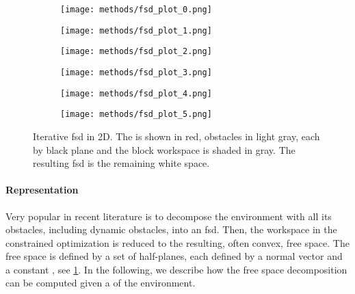 \begin{figure}[ht]
  \centering
  \begin{subfigure}{0.33\linewidth}
    \centering
    \texttt{[image: methods/fsd\_plot\_0.png]}
    \vspace*{0.5em}
  \end{subfigure}%
  \begin{subfigure}{0.33\linewidth}
    \centering
    \texttt{[image: methods/fsd\_plot\_1.png]}
    \vspace*{0.5em}
  \end{subfigure}%
  \begin{subfigure}{0.33\linewidth}
    \centering
    \texttt{[image: methods/fsd\_plot\_2.png]}
    \vspace*{0.5em}
  \end{subfigure}
  \begin{subfigure}{0.33\linewidth}
    \centering
    \texttt{[image: methods/fsd\_plot\_3.png]}
    \vspace*{0.5em}
  \end{subfigure}%
  \begin{subfigure}{0.33\linewidth}
    \centering
    \texttt{[image: methods/fsd\_plot\_4.png]}
    \vspace*{0.5em}
  \end{subfigure}%
  \begin{subfigure}{0.33\linewidth}
    \centering
    \texttt{[image: methods/fsd\_plot\_5.png]}
    \vspace*{0.5em}
  \end{subfigure}%
  \caption{Iterative \acl{fsd} in 2D. The \seed{} is shown in red, obstacles in
    light gray, each \plane{} by black plane and the block workspace is shaded
    in gray. The resulting \acs{fsd} is the remaining white space.
  }%
  \label{fig:fsd}
\end{figure}

\paragraph{Representation}
Very popular in recent literature
\cite{Tordesillas2019,Liu2017a,Spahn2021} is to decompose the environment with
all its obstacles, including dynamic obstacles, into an
\ac{fsd}. Then, the
workspace in the constrained optimization is reduced to the
resulting, often convex, free space. The free space is
defined by a set of half-planes, each defined by a normal
vector \np{} and a constant \cp{}, see \cref{fig:fsd}. In
the following, we describe how the free space decomposition
can be computed given a \pointcloud{} of the environment.

